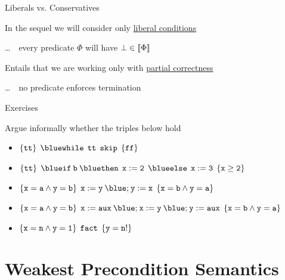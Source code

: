 \documentclass{beamer}
\begin{document}
\begin{frame}{Liberals vs. Conservatives}

        In the sequel we will consider only \alert{\underline{liberal conditions}}

        \dots \, \ie\ every predicate $\Phi$ will have $\bot \in \llbracket \Phi \rrbracket$

        \bigskip
        Entails that we are working only with \alert{\underline{partial correctness}}

        \dots \, \ie\ no predicate enforces termination
\end{frame}

\begin{frame}{Exercises}

        Argue informally whether the triples below hold
        \\[7pt]
        \begin{itemize}
                \item $\{ \prog{tt} \} \> \> \prog{{\blue while} \> \> tt \> \> skip} \> \> \{ \prog{ff} \}$
                        \\[7pt]
                \item $\{ \prog{tt} \} \> \> \prog{{\blue if} \>  b \> {\blue then} \> \> 
                        x:=2 \> \> {\blue else} \> \> x:= 3} \> \> \{ \prog{x \geq 2} \}$
                        \\[7pt]
                \item $\{ \prog{x = a \wedge y = b} \} \> \>
                        \prog{x:= y \> {\blue ;} \> y := x} \> \> \{ \prog{ x = b \wedge y = a }\}$
                        \\[7pt]
                \item $\{ \prog{x = a \wedge y = b} \} \> \>
                        \prog{x:= aux \> {\blue ;} \> 
                        x:= y \> {\blue ;} \> y := aux} \> \> \{ \prog{ x = b \wedge y = a }\}$
                        \\[7pt]
                \item $\{ \mathtt{x =n \wedge y = 1} \} \> \> \mathtt{fact} \> \> \{ \mathtt{y = n!} \}$
        \end{itemize}
\end{frame}

\section{Weakest Precondition Semantics}
\end{document}
